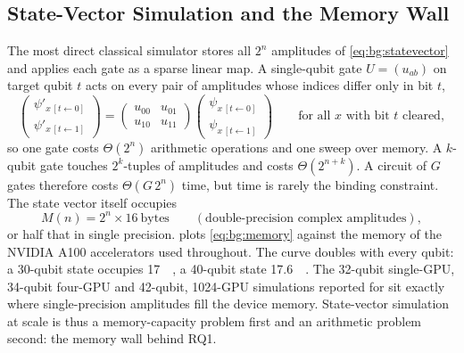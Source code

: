 \subsection{State-Vector Simulation and the Memory Wall}

The most direct classical simulator stores all $2^n$ amplitudes of \cref{eq:bg:statevector} and applies each gate as a sparse linear map. A single-qubit gate $U=(u_{ab})$ on target qubit $t$ acts on every pair of amplitudes whose indices differ only in bit $t$,
\begin{equation}\label{eq:bg:gateapply}
\begin{pmatrix}\psi'_{x\,[t\leftarrow 0]}\\ \psi'_{x\,[t\leftarrow 1]}\end{pmatrix}
=\begin{pmatrix}u_{00}&u_{01}\\ u_{10}&u_{11}\end{pmatrix}
\begin{pmatrix}\psi_{x\,[t\leftarrow 0]}\\ \psi_{x\,[t\leftarrow 1]}\end{pmatrix}
\qquad\text{for all $x$ with bit $t$ cleared},
\end{equation}
so one gate costs $\Theta(2^n)$ arithmetic operations and one sweep over memory. A $k$-qubit gate touches $2^k$-tuples of amplitudes and costs $\Theta(2^{n+k})$. A circuit of $G$ gates therefore costs $\Theta(G\,2^n)$ time, but time is rarely the binding constraint. The state vector itself occupies
\begin{equation}\label{eq:bg:memory}
M(n)=2^n\times 16\ \text{bytes}\qquad(\text{double-precision complex amplitudes}),
\end{equation}
or half that in single precision.  plots \cref{eq:bg:memory} against the memory of the NVIDIA A100 accelerators \cite{choquette2021a100} used throughout. The curve doubles with every qubit: a 30-qubit state occupies \SI{17}{\giga\byte}, a 40-qubit state \SI{17.6}{\tera\byte}. The 32-qubit single-GPU, 34-qubit four-GPU and 42-qubit, 1024-GPU simulations reported for \qgear{} \cite{guo2025qgear} sit exactly where single-precision amplitudes fill the device memory. State-vector simulation at scale is thus a memory-capacity problem first and an arithmetic problem second: the memory wall behind RQ1.

